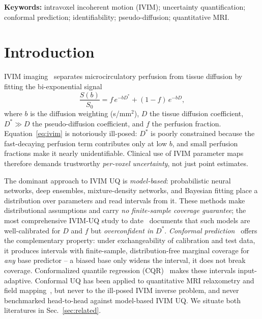\documentclass[11pt]{article}
\newcommand{\Dstar}{D^{*}}
\begin{document}
\vspace{0.5em}
\noindent\textbf{Keywords:} intravoxel incoherent motion (IVIM); uncertainty
quantification; conformal prediction; identifiability; pseudo-diffusion;
quantitative MRI.

\section{Introduction}
IVIM imaging~\citep{lebihan1988} separates microcirculatory perfusion from tissue
diffusion by fitting the bi-exponential signal
\begin{equation}
\frac{S(b)}{S_0} = f\,e^{-b\Dstar} + (1-f)\,e^{-bD},
\label{eq:ivim}
\end{equation}
where $b$ is the diffusion weighting (s/mm$^2$), $D$ the tissue diffusion
coefficient, $\Dstar \gg D$ the pseudo-diffusion coefficient, and $f$ the
perfusion fraction. Equation~\eqref{eq:ivim} is notoriously ill-posed: $\Dstar$ is
poorly constrained because the fast-decaying perfusion term contributes only at
low $b$, and small perfusion fractions make it nearly unidentifiable. Clinical use
of IVIM parameter maps therefore demands trustworthy \emph{per-voxel uncertainty},
not just point estimates.

The dominant approach to IVIM UQ is \emph{model-based}: probabilistic neural
networks, deep ensembles, mixture-density networks, and Bayesian fitting place a
distribution over parameters and read intervals from it. These methods make
distributional assumptions and carry \emph{no finite-sample coverage guarantee};
the most comprehensive IVIM-UQ study to date~\citep{casali2026} documents that
such models are well-calibrated for $D$ and $f$ but \emph{overconfident in
$\Dstar$}. \emph{Conformal prediction}~\citep{vovk2005,lei2018,angelopoulos2023}
offers the complementary property: under exchangeability of calibration and test
data, it produces intervals with finite-sample, distribution-free marginal
coverage for \emph{any} base predictor -- a biased base only widens the interval,
it does not break coverage. Conformalized quantile regression
(CQR)~\citep{romano2019} makes these intervals input-adaptive. Conformal UQ has
been applied to quantitative MRI relaxometry and field
mapping~\citep{birk2024}, but never to the ill-posed IVIM inverse problem, and
never benchmarked head-to-head against model-based IVIM UQ. We situate both
literatures in Sec.~\ref{sec:related}.
\end{document}
